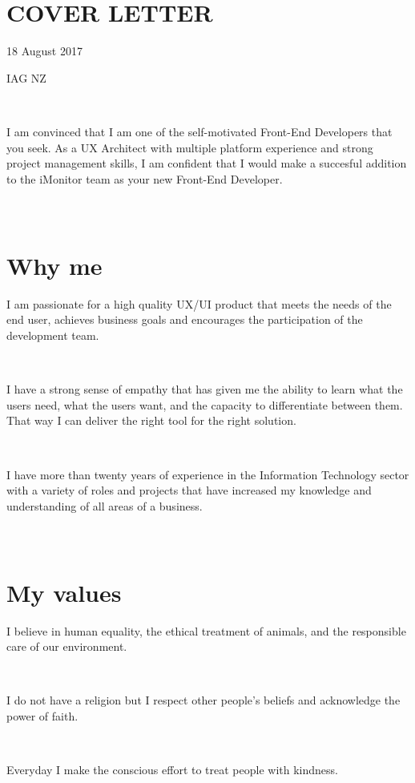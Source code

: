 \documentclass{resume}
\begin{document}



\section{\\ COVER LETTER}
  \role{}{}
  18 August 2017\par
  IAG NZ\par
  ~\par
  I am convinced that I am one of the self-motivated Front-End Developers that you seek. As a UX Architect with multiple platform experience and strong project management skills, I am confident that I would make a succesful addition to the iMonitor team as your new Front-End Developer.
  \par

\section{\\ Why me}
  \role{}{}
  I am passionate for a high quality UX/UI product that meets the needs of the end user, achieves business goals and encourages the participation of the development team.\par
  ~\par
  I have a strong sense of empathy that has given me the ability to learn what the users need, what the users want, and the capacity to differentiate between them. That way I can deliver the right tool for the right solution.\par
  ~\par
  I have more than twenty years of experience in the Information Technology sector with a variety of roles and projects that have increased my knowledge and understanding of all areas of a business.\par

\section{\\ My values}
  \role{}{}
  I believe in human equality, the ethical treatment of animals, and the responsible care of our environment.\par
  ~\par
  I do not have a religion but I respect other people's beliefs and acknowledge the power of faith.\par
  ~\par
  Everyday I make the conscious effort to treat people with kindness.\par
\end{document}
